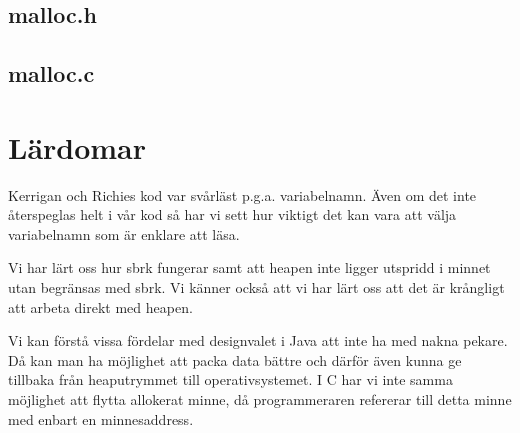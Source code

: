 \documentclass[a4paper,11pt]{article}
\begin{document}
\clearpage
\subsection*{malloc.h}


\subsection*{malloc.c}


\section*{Lärdomar}

Kerrigan och Richies kod var svårläst p.g.a. variabelnamn. Även om det inte återspeglas helt i vår kod så har vi sett hur viktigt det kan vara att välja variabelnamn som är enklare att läsa.

Vi har lärt oss hur sbrk fungerar samt att heapen inte ligger utspridd i minnet utan begränsas med sbrk. Vi känner också att vi har lärt oss att det är krångligt att arbeta direkt med heapen.

Vi kan förstå vissa fördelar med designvalet i Java att inte ha med nakna pekare. Då kan man ha möjlighet att packa data bättre och därför även kunna ge tillbaka från heaputrymmet till operativsystemet. I C har vi inte samma möjlighet att flytta allokerat minne, då programmeraren refererar till detta minne med enbart en minnesaddress.
\end{document}
